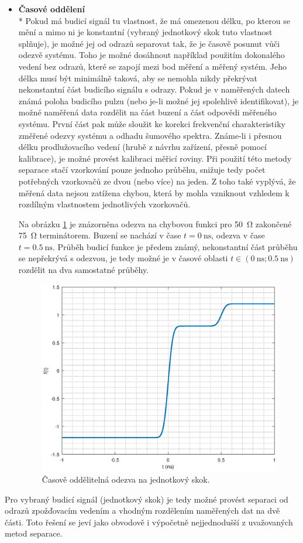 \begin{itemize}
	\item
	\textbf{Časové oddělení}\\*	
	Pokud má budicí signál tu vlastnost, že má omezenou délku, po kterou se mění a mimo ni je konstantní (vybraný jednotkový skok tuto vlastnost splňuje), je možné jej od odrazů separovat tak, že je časově posunut vůči odezvě systému. Toho je možné dosáhnout například použitím dokonalého vedení bez odrazů, které se zapojí mezi bod měření a měřený systém. Jeho délka musí být minimálně taková, aby se nemohla nikdy překrývat nekonstantní část budicího signálu s odrazy. Pokud je v naměřených datech známá poloha budicího pulzu (nebo je-li možné jej spolehlivě identifikovat), je možné naměřená data rozdělit na část buzení a část odpovědi měřeného systému. První část pak může sloužit ke korekci frekvenční charakteristiky změřené odezvy systému a odhadu šumového spektra. Známe-li i přesnou délku prodlužovacího vedení (hrubě z návrhu zařízení, přesně pomocí kalibrace), je možné provést kalibraci měřicí roviny. Při použití této metody separace stačí vzorkování pouze jednoho průběhu, snižuje tedy počet potřebných vzorkovačů ze dvou (nebo více) na jeden. Z toho také vyplývá, že měřená data nejsou zatížena chybou, která by mohla vzniknout vzhledem k rozdílným vlastnostem jednotlivých vzorkovačů.
	
	Na obrázku \ref{separableunitstep} je znázorněna odezva na chybovou funkci pro \SI{50}{\ohm} zakončené \SI{75}{\ohm} terminátorem. Buzení se nachází v čase $t=\SI{0}{\nano\second}$, odezva v čase $t=\SI{0.5}{\nano\second}$. Průběh budicí funkce je předem známý, nekonstantní část průběhu se nepřekrývá s odezvou, je tedy možné je v časové oblasti $t\in (\SI{0}{\nano\second};\SI{0.5}{\nano\second})$ rozdělit na dva samostatné průběhy.

\begin{figure}[htbp]\includegraphics[width=\textwidth,keepaspectratio]{images/separableunitstep.eps}\caption{Časově oddělitelná odezva na jednotkový skok.}\label{separableunitstep}\end{figure}	
\end{itemize}

Pro vybraný budicí signál (jednotkový skok) je tedy možné provést separaci od odrazů zpožďovacím vedením a vhodným rozdělením naměřených dat na dvě části. Toto řešení se jeví jako obvodově i výpočetně nejjednodušší z uvažovaných metod separace.